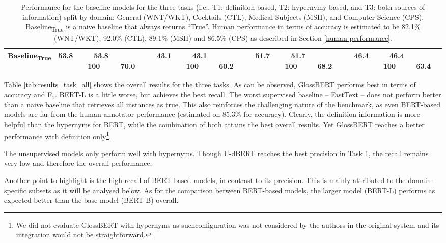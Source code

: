 \documentclass[11pt,a4paper]{article}
\begin{document}
\begin{table*}
{{\begin{tabular}{ll cc c cc c cc c cc}
\midrule

\multicolumn{2}{l}{Baseline\textsubscript{True}}  & 53.8   &   53.8~~~~~ 100~~~~~70.0   &      &   43.1   &   43.1~~~~~ 100~~~~~60.2   &      &   51.7   &   51.7~~~~~ 100~~~~~68.2   &      &   46.4   &   46.4~~~~~ 100~~~~~63.4  \\


\bottomrule
\end{tabular}
}
}
\caption{\label{tab:results_task_domain}
Performance for the baseline models for the three tasks (i.e., T1: definition-based, T2: hypernymy-based, and T3: both sources of information) split by domain: General ({WNT/WKT}), Cocktails ({CTL}), Medical Subjects ({MSH}), and Computer Science ({CPS}). Baseline\textsubscript{True} is a naive baseline that always returns ``True''. Human performance in terms of accuracy is estimated to be 82.1\% ({WNT/WKT}), 92.0\% ({CTL}), 89.1\% ({MSH}) and 86.5\% ({CPS}) as described in Section \ref{human-performance}.}
\end{table*}

Table \ref{tab:results_task_all} shows the overall results for the three tasks. As can be observed, GlossBERT performs best in terms of accuracy and F$_1$. BERT-L is a little worse, but achieves the best recall. 
The worst supervised baseline -- FastText -- does not perform better than a naive baseline that retrieves all instances as true. This also reinforces the challenging nature of the benchmark, as even BERT-based models are far from the human annotator performance (estimated on 85.3\% for accuracy). Clearly, the definition information is more helpful than the hypernyms for BERT, while the combination of both attains the best overall results. Yet GlossBERT reaches a better performance with definition only\footnote{We did not evaluate GlossBERT with hypernyms as suchconfiguration was not considered by the authors in the original system and its integration would not be straightforward.}. 

The unsupervised models only perform well with hypernyms. Though U-dBERT reaches the best precision in Task 1, the recall remains very low and therefore the overall performance.

Another point to highlight is the high recall of BERT-based models, in contrast to its precision.
This is mainly attributed to the domain-specific subsets as it will be analysed below. As for the comparison between BERT-based models, the larger model (BERT-L) performs as expected better than the base model (BERT-B) overall.
\end{document}
